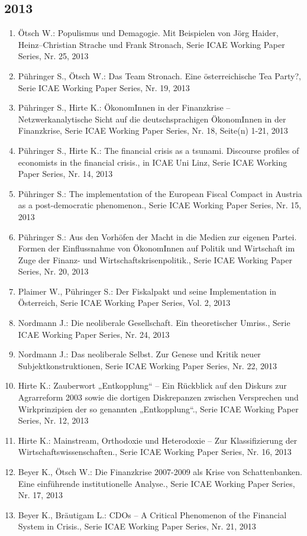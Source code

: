 \subsection*{2013}
\begin{enumerate}
    	 \item Ötsch W.: Populismus und Demagogie. Mit Beispielen von Jörg Haider, Heinz–Christian Strache und Frank Stronach, Serie ICAE Working Paper Series, Nr. 25, 2013
	 \item Pühringer S., Ötsch W.: Das Team Stronach. Eine österreichische Tea Party?, Serie ICAE Working Paper Series, Nr. 19, 2013
	 \item Pühringer S., Hirte K.: ÖkonomInnen in der Finanzkrise -- Netzwerkanalytische Sicht auf die deutschsprachigen ÖkonomInnen in der Finanzkrise, Serie ICAE Working Paper Series, Nr. 18, Seite(n) 1-21, 2013
	 \item Pühringer S., Hirte K.: The financial crisis as a tsunami. Discourse profiles of economists in the financial crisis., in ICAE Uni Linz, Serie ICAE Working Paper Series, Nr. 14, 2013
	 \item Pühringer S.: The implementation of the European Fiscal Compact in Austria as a post-democratic phenomenon., Serie ICAE Working Paper Series, Nr. 15, 2013
	 \item Pühringer S.: Aus den Vorhöfen der Macht in die Medien zur eigenen Partei. Formen der Einflussnahme von ÖkonomInnen auf Politik und Wirtschaft im Zuge der Finanz-­ und Wirtschaftskrisenpolitik., Serie ICAE Working Paper Series, Nr. 20, 2013
	 \item Plaimer W., Pühringer S.: Der Fiskalpakt und seine Implementation in Österreich, Serie ICAE Working Paper Series, Vol. 2, 2013
	 \item Nordmann J.: Die neoliberale Gesellschaft. Ein theoretischer Umriss., Serie ICAE Working Paper Series, Nr. 24, 2013
	 \item Nordmann J.: Das neoliberale Selbst. Zur Genese und Kritik neuer Subjektkonstruktionen, Serie ICAE Working Paper Series, Nr. 22, 2013
	 \item Hirte K.: Zauberwort „Entkopplung“ – Ein Rückblick auf den Diskurs zur Agrarreform 2003 sowie die dortigen Diskrepanzen zwischen Versprechen und Wirkprinzipien der so genannten „Entkopplung“., Serie ICAE Working Paper Series, Nr. 12, 2013
	 \item Hirte K.: Mainstream, Orthodoxie und Heterodoxie -- Zur Klassifizierung der Wirtschaftswissenschaften., Serie ICAE Working Paper Series, Nr. 16, 2013
	 \item Beyer K., Ötsch W.: Die Finanzkrise 2007-2009 als Krise von Schattenbanken. Eine einführende institutionelle Analyse., Serie ICAE Working Paper Series, Nr. 17, 2013
	 \item Beyer K., Bräutigam L.: CDOs – A Critical Phenomenon of the Financial System in Crisis., Serie ICAE Working Paper Series, Nr. 21, 2013
\end{enumerate}
